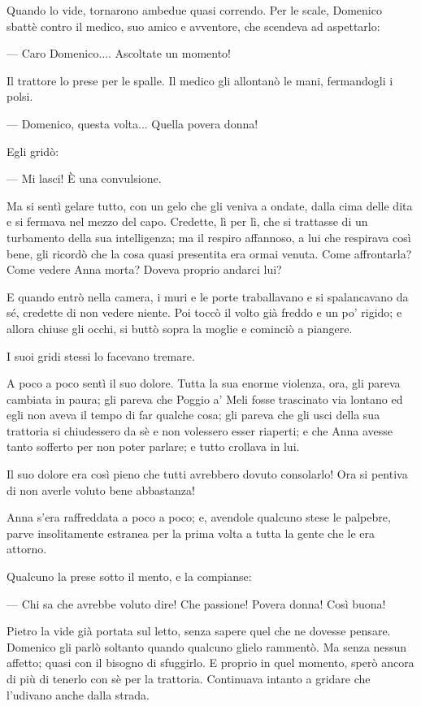 Quando lo vide, tornarono ambedue quasi correndo. Per le scale, Domenico sbattè contro il medico, suo amico e avventore, che scendeva ad aspettarlo:

— Caro Domenico.... Ascoltate un momento!

Il trattore lo prese per le spalle. Il medico gli allontanò le mani, fermandogli i polsi.

— Domenico, questa volta... Quella povera donna!

Egli gridò:

— Mi lasci! È una convulsione.

Ma si sentì gelare tutto, con un gelo che gli veniva a ondate, dalla cima delle dita e si fermava nel mezzo del capo. Credette, lì per lì, che si trattasse di un turbamento della sua intelligenza; ma il respiro affannoso, a lui che respirava così bene, gli ricordò che la cosa quasi presentita era ormai venuta. Come affrontarla? Come vedere Anna morta? Doveva proprio andarci lui?

E quando entrò nella camera, i muri e le porte traballavano e si spalancavano da sé, credette di non vedere niente. Poi toccò il volto già freddo e un po' rigido; e allora chiuse gli occhi, si buttò sopra la moglie e cominciò a piangere.

I suoi gridi stessi lo facevano tremare.

A poco a poco sentì il suo dolore. Tutta la sua enorme violenza, ora, gli pareva cambiata in paura; gli pareva che Poggio a' Meli fosse trascinato via lontano ed egli non aveva il tempo di far qualche cosa; gli pareva che gli usci della sua trattoria si chiudessero da sè e non volessero esser riaperti; e che Anna avesse tanto sofferto per non poter parlare; e tutto crollava in lui.

Il suo dolore era così pieno che tutti avrebbero dovuto consolarlo! Ora si pentiva di non averle voluto bene abbastanza!

Anna s'era raffreddata a poco a poco; e, avendole qualcuno stese le palpebre, parve insolitamente estranea per la prima volta a tutta la gente che le era attorno.

Qualcuno la prese sotto il mento, e la compianse:

— Chi sa che avrebbe voluto dire! Che passione! Povera donna! Così buona!

Pietro la vide già portata sul letto, senza sapere quel che ne dovesse pensare. Domenico gli parlò soltanto quando qualcuno glielo rammentò. Ma senza nessun affetto; quasi con il bisogno di sfuggirlo. E proprio in quel momento, sperò ancora di più di tenerlo con sè per la trattoria. Continuava intanto a gridare che l'udivano anche dalla strada.

